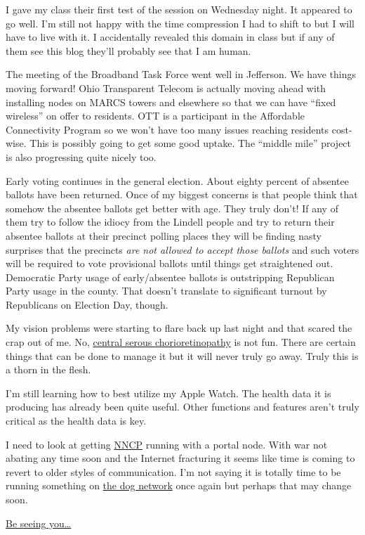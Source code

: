 I gave my class their first test of the session on Wednesday night. It
appeared to go well. I'm still not happy with the time compression I had
to shift to but I will have to live with it. I accidentally revealed
this domain in class but if any of them see this blog they'll probably
see that I am human.

The meeting of the Broadband Task Force went well in Jefferson. We have
things moving forward! Ohio Transparent Telecom is actually moving ahead
with installing nodes on MARCS towers and elsewhere so that we can have
``fixed wireless'' on offer to residents. OTT is a participant in the
Affordable Connectivity Program so we won't have too many issues
reaching residents cost-wise. This is possibly going to get some good
uptake. The ``middle mile'' project is also progressing quite nicely
too.

Early voting continues in the general election. About eighty percent of
absentee ballots have been returned. Once of my biggest concerns is that
people think that somehow the absentee ballots get better with age. They
truly don't! If any of them try to follow the idiocy from the Lindell
people and try to return their absentee ballots at their precinct
polling places they will be finding nasty surprises that the precincts
\emph{are not allowed to accept those ballots} and such voters will be
required to vote provisional ballots until things get straightened out.
Democratic Party usage of early/absentee ballots is outstripping
Republican Party usage in the county. That doesn't translate to
significant turnout by Republicans on Election Day, though.

My vision problems were starting to flare back up last night and that
scared the crap out of me. No,
\href{http://web.archive.org/web/20221103142320/https://my.clevelandclinic.org/health/diseases/24335-central-serous-retinopathy}{central
serous chorioretinopathy} is not fun. There are certain things that can
be done to manage it but it will never truly go away. Truly this is a
thorn in the flesh.

I'm still learning how to best utilize my Apple Watch. The health data
it is producing has already been quite useful. Other functions and
features aren't truly critical as the health data is key.

I need to look at getting
\href{http://web.archive.org/web/20220913101141/http://www.nncpgo.org/}{NNCP}
running with a portal node. With war not abating any time soon and the
Internet fracturing it seems like time is coming to revert to older
styles of communication. I'm not saying it is totally time to be running
something on \href{https://www.fidonet.org/index.html}{the dog network}
once again but perhaps that may change soon.

\href{https://youtu.be/QY9oWfkKt6A}{Be seeing you\ldots{}}
